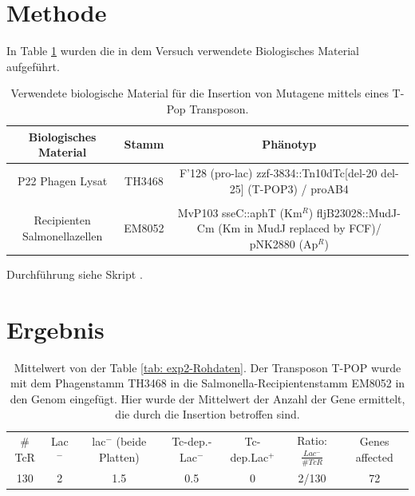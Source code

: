 \documentclass[oneside,10pt,a4paper]{report}
\begin{document}
		
		\section{Methode}
		
		In Table \ref{tab: exp2-biologisches Material} wurden die in dem Versuch verwendete Biologisches Material aufgeführt.
		
			\begin{table}[H]
			\centering
			\caption{Verwendete biologische Material für die Insertion von Mutagene mittels eines T-Pop Transposon.}
			\label{tab: exp2-biologisches Material}
			\begin{tabular}{ccc}
				\toprule
				Biologisches Material& Stamm & Phänotyp\\
				\midrule
				\multirow{2}{*}{P22 Phagen Lysat} & \multirow{2}{*}{TH3468} & \multirow{2}{*}{\parbox[t]{9cm}{F’128 (pro-lac) zzf-3834::Tn10dTc[del-20 del-25] (T-POP3) / proAB4}}\\
				&&\\
				&&\\
				\multirow{3}{*}{\parbox[t]{3cm}{Recipienten Salmonellazellen}} & \multirow{3}{*}{EM8052} &\multirow{3}{*}{\parbox[t]{9cm}{MvP103 sseC::aphT (Km$^R$) fljB23028::MudJ-Cm (Km in MudJ replaced by FCF)/ pNK2880 (Ap$^R$)}} \\
				&&\\
				&&\\

				\bottomrule			
			\end{tabular}
		\end{table}

		Durchführung siehe Skript \cite{Mibi-Script}.
		
		\section{Ergebnis}
			\begin{table}[H]
			\centering
			\caption{Mittelwert von der Table \ref{tab: exp2-Rohdaten}. Der Transposon T-POP wurde mit dem Phagenstamm TH3468 in die Salmonella-Recipientenstamm EM8052 in den Genom eingefügt. Hier wurde der Mittelwert der Anzahl der Gene ermittelt, die durch die Insertion betroffen sind.}
			\label{tab: exp2-ergebnis}
			\begin{tabular}{ccccccc}
				\toprule
			\multirow{2}{*}{$\#$TcR} & \multirow{2}{*}{Lac$^-$}&\multirow{2}{*}{lac$^-$ (beide Platten)} & \multirow{2}{*}{Tc-dep.-Lac$^-$}& \multirow{2}{*}{Tc-dep.Lac$^+$}& \multirow{2}{*}{Ratio: $\frac{Lac^-}{\#TcR}$}&\multirow{2}{*}{\parbox[*]{1.2cm}{Genes affected}}\\
				&&&&&&\\
				\midrule
				130 & 2 & 1.5 & 0.5 & 0 & 2/130 & 72\\
				\bottomrule			
			\end{tabular}
		\end{table}
		
\end{document}
